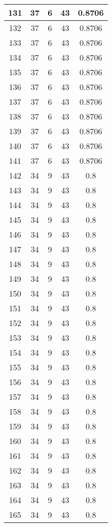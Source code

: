 \documentclass[letterpaper, 12pt]{article}
\begin{document}
\begin{longtable}{|c|c|c|c|c|}
\hline
131 & 37 & 6 & 43 & 0.8706 \\
\hline
132 & 37 & 6 & 43 & 0.8706 \\
\hline
133 & 37 & 6 & 43 & 0.8706 \\
\hline
134 & 37 & 6 & 43 & 0.8706 \\
\hline
135 & 37 & 6 & 43 & 0.8706 \\
\hline
136 & 37 & 6 & 43 & 0.8706 \\
\hline
137 & 37 & 6 & 43 & 0.8706 \\
\hline
138 & 37 & 6 & 43 & 0.8706 \\
\hline
139 & 37 & 6 & 43 & 0.8706 \\
\hline
140 & 37 & 6 & 43 & 0.8706 \\
\hline
141 & 37 & 6 & 43 & 0.8706 \\
\hline
142 & 34 & 9 & 43 & 0.8 \\
\hline
143 & 34 & 9 & 43 & 0.8 \\
\hline
144 & 34 & 9 & 43 & 0.8 \\
\hline
145 & 34 & 9 & 43 & 0.8 \\
\hline
146 & 34 & 9 & 43 & 0.8 \\
\hline
147 & 34 & 9 & 43 & 0.8 \\
\hline
148 & 34 & 9 & 43 & 0.8 \\
\hline
149 & 34 & 9 & 43 & 0.8 \\
\hline
150 & 34 & 9 & 43 & 0.8 \\
\hline
151 & 34 & 9 & 43 & 0.8 \\
\hline
152 & 34 & 9 & 43 & 0.8 \\
\hline
153 & 34 & 9 & 43 & 0.8 \\
\hline
154 & 34 & 9 & 43 & 0.8 \\
\hline
155 & 34 & 9 & 43 & 0.8 \\
\hline
156 & 34 & 9 & 43 & 0.8 \\
\hline
157 & 34 & 9 & 43 & 0.8 \\
\hline
158 & 34 & 9 & 43 & 0.8 \\
\hline
159 & 34 & 9 & 43 & 0.8 \\
\hline
160 & 34 & 9 & 43 & 0.8 \\
\hline
161 & 34 & 9 & 43 & 0.8 \\
\hline
162 & 34 & 9 & 43 & 0.8 \\
\hline
163 & 34 & 9 & 43 & 0.8 \\
\hline
164 & 34 & 9 & 43 & 0.8 \\
\hline
165 & 34 & 9 & 43 & 0.8 \\

\end{longtable}
\end{document}
